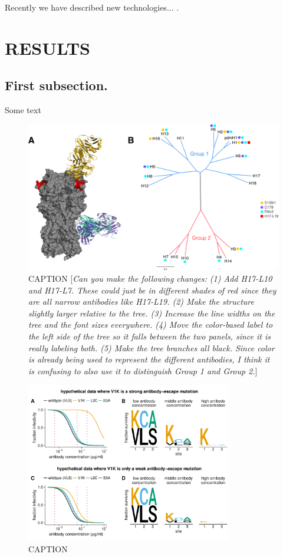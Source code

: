\documentclass[11pt]{article}
\newcommand{\comment}[1]{{\color{red}[\textsl{#1}]}}
\begin{document}
Recently we have described new technologies... \cite{doud2017complete, dingens2017comprehensive}.


\section*{RESULTS}

\subsection*{First subsection.}
Some text

\begin{figure}
\centerline{\includegraphics[width=\textwidth]{figs/antibody_summary_fig/antibody_summary_fig.pdf}}
\caption{\label{fig:antibody_summary}
CAPTION
\comment{Can you make the following changes:
(1) Add H17-L10 and H17-L7. These could just be in different shades of red since they are all narrow antibodies like H17-L19. (2) Make the structure slightly larger relative to the tree. (3) Increase the line widths on the tree and the font sizes everywhere. (4) Move the color-based label to the left side of the tree so it falls between the two panels, since it is really labeling both. (5) Make the tree branches all black. Since color is already being used to represent the different antibodies, I think it is confusing to also use it to distinguish Group 1 and Group 2.}}
\end{figure}

\begin{figure}
\centerline{\includegraphics[width=0.8\textwidth]{figs/fracsurvive_example/frac_survive_example_plot.pdf}}
\caption{\label{fig:fracsurvive_example}
CAPTION}
\end{figure}
\end{document}

